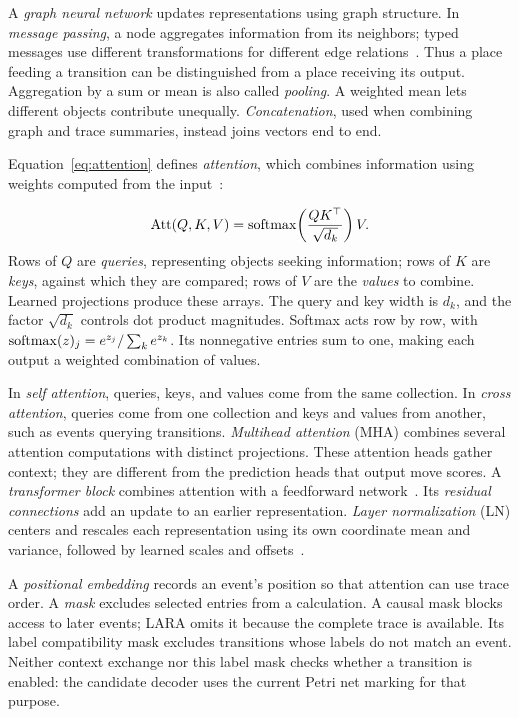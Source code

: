A \emph{graph neural network} updates representations using graph structure. In \emph{message passing}, a node aggregates information from its neighbors; typed messages use different transformations for different edge relations~\cite{Gilmer2017}. Thus a place feeding a transition can be distinguished from a place receiving its output. Aggregation by a sum or mean is also called \emph{pooling}. A weighted mean lets different objects contribute unequally. \emph{Concatenation}, used when combining graph and trace summaries, instead joins vectors end to end.

\begin{revised}Equation~\eqref{eq:attention} defines \emph{attention}, which combines information using weights computed from the input~\cite{Vaswani2017}:\end{revised}
\begin{equation}
 \operatorname{Att}(Q,K,V)=\operatorname{softmax}\!\left(\frac{QK^\top}{\sqrt{d_k}}\right)V.
 \label{eq:attention}
\end{equation}
Rows of $Q$ are \emph{queries}, representing objects seeking information; rows of $K$ are \emph{keys}, against which they are compared; rows of $V$ are the \emph{values} to combine. Learned projections produce these arrays. The query and key width is $d_k$, and the factor $\sqrt{d_k}$ controls dot product magnitudes. Softmax acts row by row, with $\operatorname{softmax}(z)_j=e^{z_j}/\sum_k e^{z_k}$. Its nonnegative entries sum to one, making each output a weighted combination of values.

In \emph{self attention}, queries, keys, and values come from the same collection. In \emph{cross attention}, queries come from one collection and keys and values from another, such as events querying transitions. \emph{Multihead attention} (MHA) combines several attention computations with distinct projections. These attention heads gather context; they are different from the prediction heads that output move scores. A \emph{transformer block} combines attention with a feedforward network~\cite{Vaswani2017}. Its \emph{residual connections} add an update to an earlier representation. \emph{Layer normalization} (LN) centers and rescales each representation using its own coordinate mean and variance, followed by learned scales and offsets~\cite{Ba2016}.

A \emph{positional embedding} records an event's position so that attention can use trace order. A \emph{mask} excludes selected entries from a calculation. A causal mask blocks access to later events; LARA omits it because the complete trace is available. Its label compatibility mask excludes transitions whose labels do not match an event. Neither context exchange nor this label mask checks whether a transition is enabled: the candidate decoder uses the current Petri net marking for that purpose.


